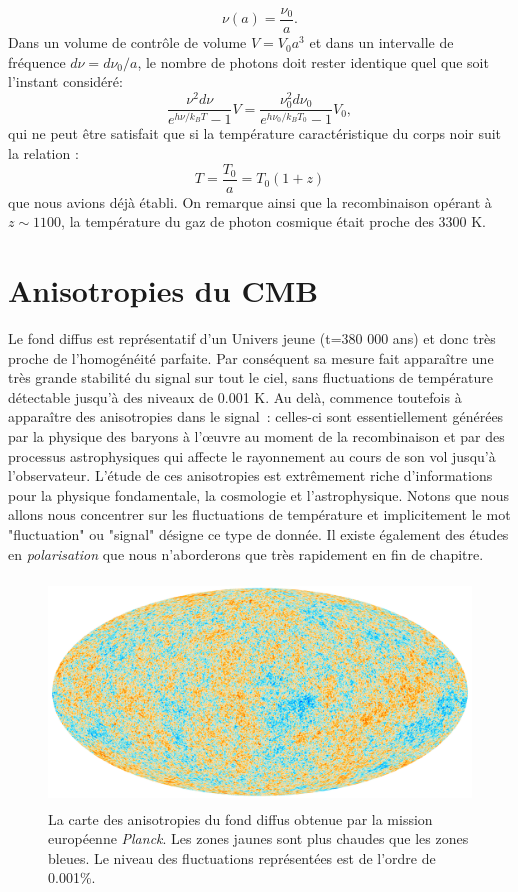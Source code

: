 \begin{equation}
\nu(a)=\frac{\nu_0}{a}.
\end{equation}
Dans un volume de contrôle de volume $V=V_0a^3$ et dans un intervalle de fréquence $d\nu=d\nu_0/a$, le nombre de photons doit rester identique quel que soit l'instant considéré:
\begin{equation}
\frac{\nu^2d\nu}{e^{h\nu/k_BT}-1}V=\frac{\nu_0^2d\nu_0}{e^{h\nu_0/k_BT_0}-1}V_0,
\end{equation}
qui ne peut être satisfait que si la température caractéristique du corps noir suit la relation :
\begin{equation}
T=\frac{T_0}{a}=T_0(1+z)
\end{equation}
que nous avions déjà établi. On remarque ainsi que la recombinaison opérant à $z\sim1100$, la température du gaz de photon cosmique était proche des 3300 K.

\section{Anisotropies du CMB}
Le fond diffus est représentatif d'un Univers jeune (t=380 000 ans) et donc très proche de l'homogénéité parfaite. Par conséquent sa mesure fait apparaître une très grande stabilité du signal sur tout le ciel, sans fluctuations de température détectable jusqu'à des niveaux de 0.001 K. Au delà, commence toutefois à apparaître des anisotropies dans le signal~: celles-ci sont essentiellement générées par la physique des baryons à l'œuvre au moment de la recombinaison et par des processus astrophysiques qui affecte le rayonnement au cours de son vol jusqu'à l'observateur. L'étude de ces anisotropies est extrêmement riche d'informations pour la physique fondamentale, la cosmologie et l'astrophysique. Notons que nous allons nous concentrer sur les fluctuations de température et implicitement le mot "fluctuation" ou "signal" désigne ce type de donnée. Il existe également des études en \textit{polarisation} que nous n'aborderons que très rapidement en fin de chapitre.

\begin{figure}[htbp]
	\centering
		\includegraphics[height=6cm]{figs/planck2015.png}
		\caption[Les fluctuations de températures vues par Planck]{La carte des anisotropies du fond diffus obtenue par la mission européenne \textit{Planck}. Les zones jaunes sont plus chaudes que les zones bleues. Le niveau des fluctuations représentées est de l'ordre de 0.001\%.}
	\label{f:planckmap}
\end{figure}

